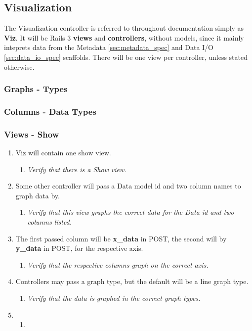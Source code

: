 \subsection{Visualization}
\label{sec:viz_spec}
The Visualization controller is referred to throughout documentation simply as
\textbf{Viz}. It will be Rails 3 \textbf{views} and \textbf{controllers},
without models, since it mainly inteprets data from the Metadata
\ref{sec:metadata_spec} and Data I/O \ref{sec:data_io_spec} scaffolds. There 
will be one view per controller, unless stated otherwise.

\subsubsection{Graphs - Types}

\subsubsection{Columns - Data Types}

\subsubsection{Views - Show}
	\begin{enumerate}
		\item Viz will contain one show view. 
		\begin{enumerate}
			\item \textit{Verify that there is a Show view.}
		\end{enumerate}

		\item Some other controller will pass a Data model id and 
			two column names to graph data by.
		\begin{enumerate}
			\item \textit{Verify that this view graphs the 
				correct data for the Data id and two 
				columns listed.}
		\end{enumerate}

		\item The first passed column will be \textbf{x\_data} 
			in POST, the second will by \textbf{y\_data} in 
			POST, for the respective axis.
		\begin{enumerate}
			\item \textit{Verify that the respective columns 
				graph on the correct axis.}
		\end{enumerate}

		\item Controllers may pass a graph type, but the default 
			will be a line graph type.
		\begin{enumerate}
			\item \textit{Verify that the 
				data is graphed in the correct graph types.}
		\end{enumerate}


		\item 
		\begin{enumerate}
			\item 
		\end{enumerate}

	\end{enumerate}

